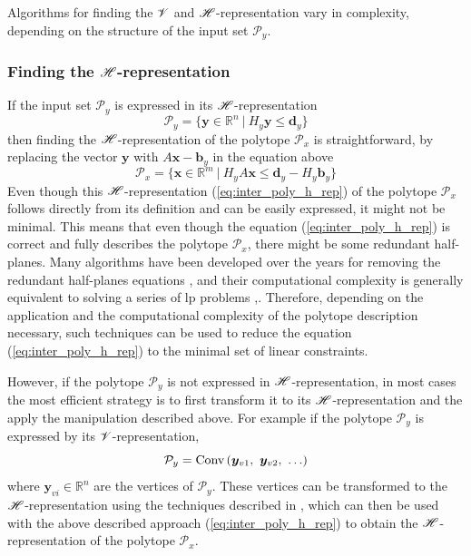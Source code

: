 Algorithms for finding the $\mathscr{V}$ and $\mathscr{H}$-representation vary in complexity, depending on the structure of the input set $\mathcal{P}_y$.

\subsubsection{Finding the $\mathscr{H}$-representation} 
\label{ch:inter_h_rep}
If the input set $\mathcal{P}_y$ is expressed in its $\mathscr{H}$-representation
\begin{equation}
    \mathcal{P}_y = \{ \bm{y}\in \mathbb{R}^n ~|~H_y\bm{y} \leq \bm{d}_y\}
    \label{eq:step1_inter_h}
\end{equation}
then finding the $\mathscr{H}$-representation of the polytope $\mathcal{P}_x$ is straightforward, by replacing the vector $\bm{y}$ with $A\bm{x} - \bm{b}_y$ in the equation above
\begin{equation}
    \mathcal{P}_x=\{\bm{x}\in  \mathbb{R}^m~|~ H_yA\bm{x} \leq \bm{d}_y -H_y\bm{b}_y \}
    \label{eq:inter_poly_h_rep}
\end{equation}
Even though this $\mathscr{H}$-representation (\ref{eq:inter_poly_h_rep}) of the polytope $\mathcal{P}_x$ follows directly from its definition and can be easily expressed, it might not be minimal. This means that even though the equation (\ref{eq:inter_poly_h_rep}) is correct and fully describes the polytope $\mathcal{P}_x$, there might be some redundant half-planes. Many algorithms have been developed over the years for removing the redundant half-planes equations \cite{Paulraj2006}, and their computational complexity is generally equivalent to solving a series of \gls{lp} problems \cite{Telgen1983},\cite[Chapter 7.2]{fukuda2016lecture}. Therefore, depending on the application and the computational complexity of the polytope description necessary, such techniques can be used to reduce the equation (\ref{eq:inter_poly_h_rep}) to the minimal set of linear constraints.

However, if the polytope $\mathcal{P}_y$ is not expressed in $\mathscr{H}$-representation, in most cases the most efficient strategy is to first transform it to its $\mathscr{H}$-representation and the apply the manipulation described above. For example if the polytope $\mathcal{P}_y$ is expressed by its $\mathscr{V}$-representation, 
\begin{equation}
    \mathcal{P}_y = \text{Conv}\left( \bm{y}_{v1}, ~ \bm{y}_{v2},~ \ldots\right)
\end{equation}
where $\bm{y}_{vi} \in \mathbb{R}^n$ are the vertices of $\mathcal{P}_y$.  These vertices can be transformed to the $\mathscr{H}$-representation using the techniques described in , which can then be used with the above described approach (\ref{eq:inter_poly_h_rep}) to obtain the $\mathscr{H}$-representation of the polytope $\mathcal{P}_x$.

